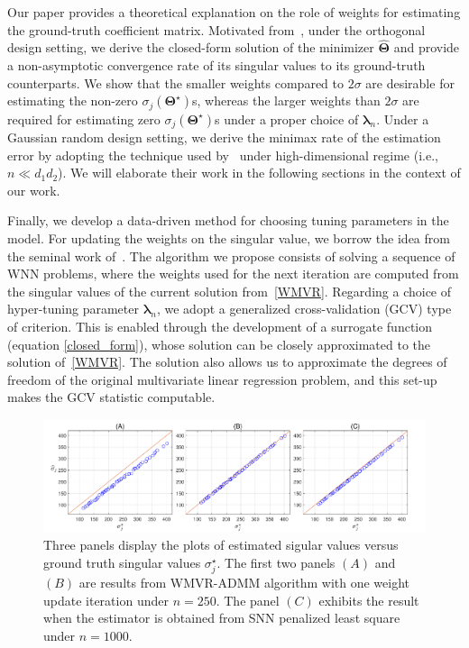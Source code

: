 \documentclass[alpha-refs]{wiley-article}
\begin{document}
Our paper provides a theoretical explanation on the role of weights for estimating the ground-truth coefficient matrix.
Motivated from~\citet{yuan2007dimension}, under the orthogonal design setting, we derive the closed-form solution of the minimizer $\widehat{\boldsymbol{\Theta}}$ and provide a non-asymptotic convergence rate of its singular values to its ground-truth counterparts.
We show that the smaller weights compared to $2\sigma$ are desirable for estimating the non-zero $\sigma_{j}(\boldsymbol{\Theta}^{\star})$s, whereas the larger weights than $2\sigma$ are required for estimating zero $\sigma_{j}(\boldsymbol{\Theta}^{\star})$s under a proper choice of $\boldsymbol{\lambda}_{n}$.
Under a Gaussian random design setting, we derive the minimax rate of the estimation error by adopting the technique used by~\citet{negahban2011estimation} under high-dimensional regime (i.e., $n \ll d_{1}d_{2}$).
We will elaborate their work in the following sections in the context of our work.

Finally, we develop a data-driven method for choosing tuning parameters in the model.
For updating the weights on the singular value, we borrow the idea from the seminal work of~\citet{candes2008enhancing}.
The algorithm we propose consists of solving a sequence of WNN problems, where the weights used for the next iteration are computed from the singular values of the current solution from~\eqref{WMVR}.
Regarding a choice of hyper-tuning parameter $\boldsymbol{\lambda}_{n}$, we adopt a generalized cross-validation (GCV) type of criterion.
This is enabled through the development of a surrogate function (equation \eqref{closed_form}), whose solution can be closely approximated to the solution of~\eqref{WMVR}. The solution also allows us to approximate the degrees of freedom of the original multivariate linear regression problem,  and this set-up makes the GCV statistic computable.

\begin{figure}
  \includegraphics[width=150mm]{Figure/Fig1.pdf}
  \centering
  \caption{Three panels display the plots of estimated sigular values versus ground truth singular values $\sigma^{\star}_{j}$.
  The first two panels $(A)$ and $(B)$ are results from WMVR-ADMM algorithm with one weight update iteration under $n=250$.
  The panel $(C)$ exhibits the result when the estimator is obtained from SNN penalized least square under $n=1000$. }
  \label{Fig1}
\end{figure}
\end{document}
